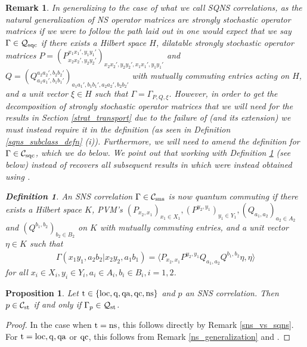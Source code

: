 \documentclass[11pt]{amsart}
\newtheorem{proposition}[theorem]{Proposition}
\newtheorem{definition}[theorem]{Definition}
\newtheorem{remark}[theorem]{Remark}
\newcommand{\cl}[1]{\mathcal{#1}}
\begin{document}
\begin{remark}
In generalizing to the case of what we call SQNS correlations, as the natural generalization of NS operator matrices are strongly stochastic operator matrices if we were to follow the path laid out in \cite[Definition 5.6 (i)]{gt_one} one would expect that we say $\Gamma \in \cl{Q}_{\rm sqc}$ if there exists a Hilbert space $H$, dilatable strongly stochastic operator matrices $P = (P_{x_{2}x_{2}', y_{2}y_{2}'}^{x_{1}x_{1}', y_{1}y_{1}'})_{x_{2}x_{2}', y_{2}y_{2}', x_{1}x_{1}', y_{1}y_{1}'}$ and $Q = (Q_{a_{1}a_{1}', b_{1}b_{1}'}^{a_{2}a_{2}', b_{2}b_{2}'})_{a_{1}a_{1}', b_{1}b_{1}', a_{2}a_{2}', b_{2}b_{2}'}$ with mutually commuting entries acting on $H$, and a unit vector $\xi \in H$ such that $\Gamma = \Gamma_{P, Q, \xi}$. However, in order to get the decomposition of strongly stochastic operator matrices that we will need for the results in Section \ref{strat_transport} due to the failure of \cite[Lemma 5.8]{gt_one} (and its extension) we must instead require it in the definition (as seen in Definition \ref{sqns_subclass_defn} (i)). Furthermore, we will need to amend the definition for $\Gamma \in \cl{C}_{\rm sqc}$, which we do below. We point out that working with Definition \ref{sqc_amended_definition} (see below) instead of \cite[Definition 5.6(i)]{gt_one} recovers all subsequent results in \cite{gt_one} which were instead obtained using \cite[Lemma 5.8]{gt_one}. 
\begin{definition}\label{sqc_amended_definition}
An SNS correlation $\Gamma \in \cl{C}_{\rm sns}$ is now quantum commuting if there exists a Hilbert space $K$, PVM's $(P_{x_{2}, x_{1}})_{x_{1} \in X_{1}}, (P^{y_{2}, y_{1}})_{y_{1} \in Y_{1}}, (Q_{a_{1}, a_{2}})_{a_{2} \in A_{2}}$ and $(Q^{b_{1}, b_{2}})_{b_{2} \in B_{2}}$ on $K$ with mutually commuting entries, and a unit vector $\eta \in K$ such that
\begin{gather*}
	\Gamma(x_{1}y_{1}, a_{2}b_{2}|x_{2}y_{2}, a_{1}b_{1}) = \langle P_{x_{2}, x_{1}}P^{y_{2}, y_{1}}Q_{a_{1}, a_{2}}Q^{b_{1}, b_{2}}\eta, \eta\rangle
\end{gather*}
\noindent for all $x_{i} \in X_{i}, y_{i} \in Y_{i}, a_{i} \in A_{i}, b_{i} \in B_{i}, i = 1, 2$. 

\end{definition}
\end{remark}

\begin{proposition}\label{st_vs_qst}
Let ${\rm t} \in \{\rm loc, q, qa, qc, ns\}$ and $p$ an SNS correlation. Then $p \in \cl{C}_{\rm st}$ if and only if $\Gamma_{p} \in \cl{Q}_{\rm st}$. 
\end{proposition}
\begin{proof}
In the case when ${\rm t} = {\rm ns}$, this follows directly by Remark \ref{sns_vs_sqns}. For ${\rm t} = {\rm loc, q, qa}$ or ${\rm qc}$, this follows from Remark \ref{ns_generalization} and \cite[Lemma 7.2]{tt}.
\end{proof}
\end{document}
